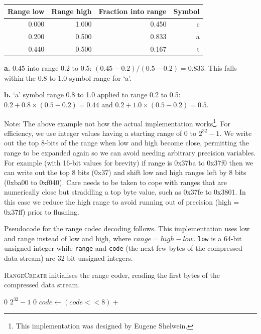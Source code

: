 \documentclass[a4paper]{article}
\begin{document}
\begin{threeparttable}[t]
\begin{tabular}{rrrr}
\hline
\textbf{Range low} & \textbf{Range high} & \textbf{Fraction into range} & \textbf{Symbol}\\
\hline
0.000 & 1.000 & 0.450 & c\\
0.200 & 0.500 & 0.833\tnote{\textbf{a}} & a\\
0.440\tnote{\textbf{b}} & 0.500 & 0.167 & t\\
\hline
\end{tabular}
\begin{tablenotes}
\item{\textbf{a.}} 0.45 into range 0.2 to 0.5: $(0.45-0.2)/(0.5-0.2) = 0.833$.
This falls within the 0.8 to 1.0 symbol range for `a'.
\item{\textbf{b.}} `a' symbol range 0.8 to 1.0 applied to range 0.2 to 0.5:  $0.2+0.8\times(0.5-0.2) = 0.44$ and $0.2+1.0\times(0.5-0.2) = 0.5$.
\end{tablenotes}
\end{threeparttable}

Note: The above example not how the actual implementation works\footnote{This implementation was designed by Eugene Shelwein.}.
For efficiency, we use integer values having a starting range of 0 to $2^{32}-1$.
We write out the top 8-bits of the range when low and high become close, permitting the range to be expanded again so we can avoid needing arbitrary precision variables.
For example (with 16-bit values for brevity) if range is 0x37ba to 0x37f0 then we can write out the top 8 bits (0x37) and shift low and high ranges left by 8 bits (0xba00 to 0xf040).
Care needs to be taken to cope with ranges that are numerically close but straddling a top byte value, such as 0x37fe to 0x3801.
In this case we reduce the high range to avoid running out of precision (high = 0x37ff) prior to flushing.

Pseudocode for the range codec decoding follows.  This implementation uses low and range instead of low and high, where $range = high - low$.
\texttt{low} is a 64-bit unsigned integer while \texttt{range} and \texttt{code} (the next few bytes of the compressed data stream) are 32-bit unsigned integers.

\textsc{RangeCreate} initialises the range coder, reading the first bytes of the compressed data stream.

\begin{algorithmic}[1]
  \settowidth{\maxwidth}{range\ }
  \State {} $0$
  \State {} $2^{32}-1$
  \State {} $0$
    \State $code \gets (code << 8) + $
  \EndFor
\EndProcedure
\end{algorithmic}
\end{document}
